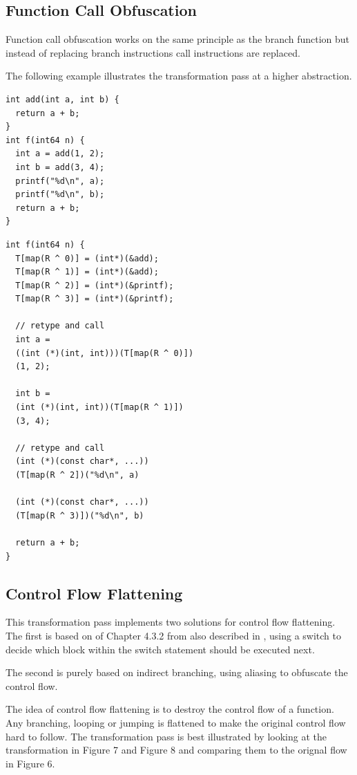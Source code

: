 \subsection{Function Call Obfuscation}

Function call obfuscation works on the same principle as the branch function but instead of replacing branch instructions
call instructions are replaced.

The following example illustrates the transformation pass at a higher abstraction.

\lstset{language=C++} %
\lstset{basicstyle=\ttfamily} %
\begin{lstlisting}
int add(int a, int b) {
  return a + b;
}
int f(int64 n) {
  int a = add(1, 2);
  int b = add(3, 4);
  printf("%d\n", a);
  printf("%d\n", b);
  return a + b;
}
\end{lstlisting}

\lstset{language=C++} %
\lstset{basicstyle=\ttfamily} %
\begin{lstlisting}
int f(int64 n) {
  T[map(R ^ 0)] = (int*)(&add);
  T[map(R ^ 1)] = (int*)(&add);
  T[map(R ^ 2)] = (int*)(&printf);
  T[map(R ^ 3)] = (int*)(&printf);

  // retype and call
  int a =
  ((int (*)(int, int)))(T[map(R ^ 0)])
  (1, 2);

  int b =
  (int (*)(int, int))(T[map(R ^ 1)])
  (3, 4);

  // retype and call
  (int (*)(const char*, ...))
  (T[map(R ^ 2])("%d\n", a)

  (int (*)(const char*, ...))
  (T[map(R ^ 3)])("%d\n", b)

  return a + b;
}
\end{lstlisting}

\subsection{Control Flow Flattening}

This transformation pass implements two solutions for control flow flattening. The first is based on of Chapter 4.3.2 from \cite{ss-chpt4} also
described in \cite{ollvm}, using a switch to decide which block within the switch statement should be executed next.

The second is purely based on indirect branching, using aliasing to obfuscate the control flow.

The idea of control flow flattening is to destroy the control flow of a function. Any branching, looping or jumping is
flattened to make the original control flow hard to follow. The transformation pass is best illustrated by looking at the
transformation in Figure 7 and Figure 8 and comparing them to the orignal flow in Figure 6.

